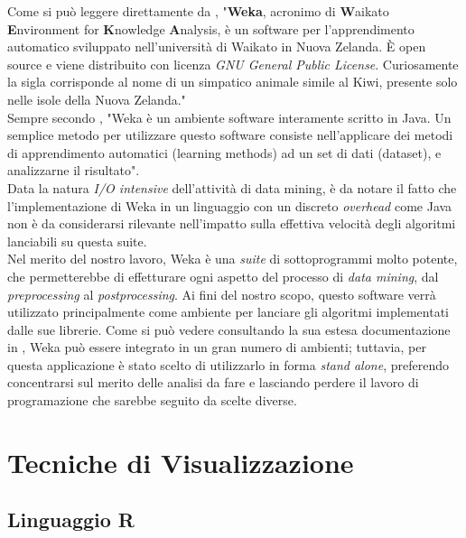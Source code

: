     Come si può leggere direttamente da \cite{wekawiki}, "\textbf{Weka}, acronimo di \textbf{W}aikato \textbf{E}nvironment for \textbf{K}nowledge \textbf{A}nalysis, è un software per l'apprendimento automatico sviluppato nell'università di Waikato in Nuova Zelanda. È open source e viene distribuito con licenza \textit{GNU General Public License}. Curiosamente la sigla corrisponde al nome di un simpatico animale simile al Kiwi, presente solo nelle isole della Nuova Zelanda." \\

    Sempre secondo \cite{wekawiki}, "Weka è un ambiente software interamente scritto in Java. Un semplice metodo per utilizzare questo software consiste nell'applicare dei metodi di apprendimento automatici (learning methods) ad un set di dati (dataset), e analizzarne il risultato". \\

    Data la natura \textit{I/O intensive} dell'attività di data mining, è da notare il fatto che l'implementazione di Weka in un linguaggio con un discreto \textit{overhead} come Java non è da considerarsi rilevante nell'impatto sulla effettiva velocità degli algoritmi lanciabili su questa suite.\\

    Nel merito del nostro lavoro, Weka è una \textit{suite} di sottoprogrammi molto potente, che permetterebbe di effetturare ogni aspetto del processo di \textit{data mining}, dal \textit{preprocessing} al \textit{postprocessing}. Ai fini del nostro scopo, questo software verrà utilizzato principalmente come ambiente per lanciare gli algoritmi implementati dalle sue librerie. Come si può vedere consultando la sua estesa documentazione in \cite{weka}, Weka può essere integrato in un gran numero di ambienti; tuttavia, per questa applicazione è stato scelto di utilizzarlo in forma \textit{stand alone}, preferendo concentrarsi sul merito delle analisi da fare e lasciando perdere il lavoro di programazione che sarebbe seguito da scelte diverse.\\

\section{Tecniche di Visualizzazione}

    \subsection{Linguaggio R}


